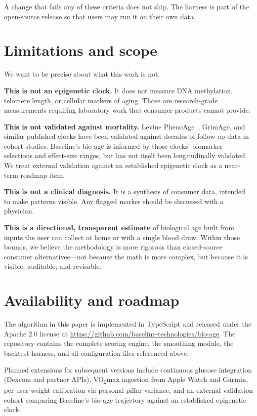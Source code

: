 \documentclass[10pt, a4paper]{article}
\begin{document}
A change that fails any of these criteria does not ship. The harness is part of the open-source release so that users may run it on their own data.

\section{Limitations and scope}

We want to be precise about what this work is not.

\textbf{This is not an epigenetic clock.} It does not measure DNA methylation, telomere length, or cellular markers of aging. Those are research-grade measurements requiring laboratory work that consumer products cannot provide.

\textbf{This is not validated against mortality.} Levine PhenoAge~\cite{levine_phenoage_2018}, GrimAge, and similar published clocks have been validated against decades of follow-up data in cohort studies. Baseline's bio age is informed by those clocks' biomarker selections and effect-size ranges, but has not itself been longitudinally validated. We treat external validation against an established epigenetic clock as a near-term roadmap item.

\textbf{This is not a clinical diagnosis.} It is a synthesis of consumer data, intended to make patterns visible. Any flagged marker should be discussed with a physician.

\textbf{This is a directional, transparent estimate} of biological age built from inputs the user can collect at home or with a single blood draw. Within those bounds, we believe the methodology is more rigorous than closed-source consumer alternatives---not because the math is more complex, but because it is visible, auditable, and revisable.

\section{Availability and roadmap}

The algorithm in this paper is implemented in TypeScript and released under the Apache 2.0 license at \url{https://github.com/baseline-technologies/bio-age}. The repository contains the complete scoring engine, the smoothing module, the backtest harness, and all configuration files referenced above.

Planned extensions for subsequent versions include continuous glucose integration (Dexcom and partner APIs), VO\textsubscript{2}max ingestion from Apple Watch and Garmin, per-user weight calibration via personal pillar variance, and an external validation cohort comparing Baseline's bio-age trajectory against an established epigenetic clock.
\end{document}
